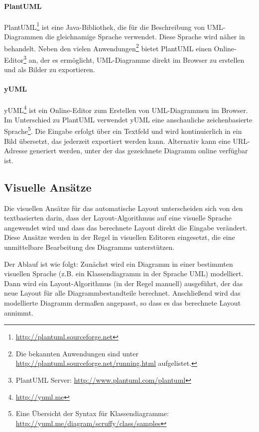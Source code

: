 \paragraph{PlantUML}


PlantUML\footnote{\url{http://plantuml.sourceforge.net}} ist eine Java-Bibliothek, die für die Beschreibung von UML-Diagrammen die gleichnamige Sprache verwendet. Diese Sprache wird näher in \cite{Roques10Drawing} behandelt. Neben den vielen Anwendungen\footnote{Die bekannten Anwendungen sind unter \url{http://plantuml.sourceforge.net/running.html} aufgelistet.} bietet PlantUML einen Online-Editor\footnote{PlantUML Server: \url{http://www.plantuml.com/plantuml}} an, der es ermöglicht, UML-Diagramme direkt im Browser zu erstellen und als Bilder zu exportieren.

\paragraph{yUML}

yUML\footnote{\url{http://yuml.me}} ist ein Online-Editor zum Erstellen von UML-Diagrammen im Browser. Im Unterschied zu PlantUML verwendet yUML eine anschauliche zeichenbasierte Sprache\footnote{Eine Übersicht der Syntax für Klassendiagramme: \url{http://yuml.me/diagram/scruffy/class/samples}}. Die Eingabe erfolgt über ein Textfeld und wird kontinuierlich in ein Bild übersetzt, das jederzeit exportiert werden kann. Alternativ kann eine URL-Adresse generiert \cite{Fuhrmann11On-the-Pragmatics} werden, unter der das gezeichnete Diagramm online verfügbar ist.

\subsection{Visuelle Ansätze}
\label{subsec:visual-approaches}

Die visuellen Ansätze für das automatische Layout unterscheiden sich von den textbasierten darin, dass der Layout-Algorithmus auf eine visuelle Sprache angewendet wird und dass das berechnete Layout direkt die Eingabe verändert. Diese Ansätze werden in der Regel in visuellen Editoren eingesetzt, die eine unmittelbare Bearbeitung des Diagramms unterstützen.

Der Ablauf ist wie folgt: Zunächst wird ein Diagramm in einer bestimmten visuellen Sprache (z.B. ein Klassendiagramm in der Sprache UML) modelliert. Dann wird ein Layout-Algorithmus (in der Regel manuell) ausgeführt, der das neue Layout für alle Diagrammbestandteile berechnet. Anschließend wird das modellierte Diagramm dermaßen angepasst, so dass es das berechnete Layout annimmt.

